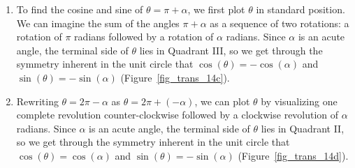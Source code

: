 \begin{example}
\begin{enumerate}
\item  To find the cosine and sine of $\theta = \pi + \alpha$, we first plot $\theta$ in standard position. We can imagine the sum of the angles $\pi + \alpha$ as a sequence of two rotations: a rotation of $\pi$ radians followed by a rotation of  $\alpha$ radians. Since $\alpha$ is an acute angle, the terminal side of $\theta$ lies in Quadrant III, so we get through the symmetry inherent in the unit circle that $\cos(\theta) = - \cos(\alpha)$ and $\sin(\theta) = -\sin(\alpha)$ (Figure~\ref{fig_trans_14c}).


\item  Rewriting $\theta = 2\pi - \alpha$ as $\theta = 2\pi + (-\alpha)$, we can  plot $\theta$ by visualizing one complete revolution counter-clockwise followed by a clockwise  revolution  of $\alpha$ radians.  Since $\alpha$ is an acute angle, the terminal side of $\theta$ lies in Quadrant II, so we get through the symmetry inherent in the unit circle that  $\cos(\theta) =  \cos(\alpha)$ and $\sin(\theta) = -\sin(\alpha)$ (Figure~\ref{fig_trans_14d}).



\end{enumerate}


\end{example}
